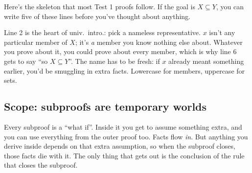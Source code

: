 Here's the skeleton that most Test 1 proofs follow. If the goal is $X\subseteq Y$, you can write five of these lines before you've thought about anything.

\begin{center}
\end{center}

Line 2 is the heart of univ.\ intro.: pick a nameless representative. $x$ isn't any particular member of $X$; it's \emph{a} member you know nothing else about. Whatever you prove about it, you could prove about every member, which is why line 6 gets to say ``so $X\subseteq Y$''. The name has to be fresh: if $x$ already meant something earlier, you'd be smuggling in extra facts. Lowercase for members, uppercase for sets.

\subsection{Scope: subproofs are temporary worlds}

Every subproof is a ``what if''. Inside it you get to assume something extra, and you can use everything from the outer proof too. Facts flow \emph{in}. But anything you derive inside depends on that extra assumption, so when the subproof closes, those facts die with it. The only thing that gets out is the conclusion of the rule that closes the subproof.

